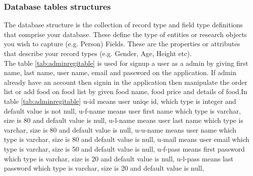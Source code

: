 \documentclass[12pt,a4paper]{article}
\newcommand\tab[1][1cm]{\hspace*{#1}}
\begin{document}
	\subsubsection{Database tables structures}
	\tab The database structure is the collection of record type and field type definitions that comprise your database. These define the type of entities or research objects you wish to capture (e.g. Person) Fields. These are the properties or attributes that describe your record types (e.g. Gender, Age, Height etc).\\
		\tab The table \ref{tab:adminregitable} is used for signup a user as a admin by giving first name, last name, user name, email and password on the application. If admin already have an account then signin in the application then manipulate the order list or add food on food list by given food name, food price and details of food.In table \ref{tab:adminregitable} u-id means user uniqe id, which type is integer and default value is not null, u-f-name means user first name which type is varchar, size is 80 and default value is null, u-l-name means user last name which type is varchar, size is 80 and default value is null, u-u-name means user name which type is varchar, size is 80 and default value is null, u-mail means user email which type is varchar, size is 50 and default value is null, u-f-pass means first password which type is varchar, size is 20 and default value is null, u-l-pass means last password which type is varchar, size is 20 and default value is null, 
\end{document}
